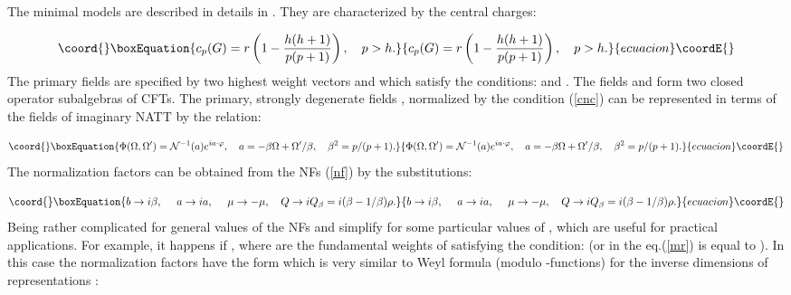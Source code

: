 \documentclass[a4paper,12pt]{article}
\begin{document}
The minimal models \coordHE{} are described in details in \cite{FL}. 
They are characterized by the central charges:

\begin{equation}\coord{}\boxEquation{
c_p(G)=r\left( 1-\frac{h(h+1)}{p(p+1)}\right) ,\quad p>h.  \label{cch}
}{
c_p(G)=r\left( 1-\frac{h(h+1)}{p(p+1)}\right) ,\quad p>h.  }{ecuacion}\coordE{}\end{equation}
The primary fields \coordHE{} are
specified by two highest weight vectors \myHighlight{$\Omega $}\coordHE{} and \myHighlight{$\Omega ^{\prime }$}\coordHE{}
which satisfy the conditions: \coordHE{} and  
\coordHE{}. 
The fields \coordHE{} and \coordHE{} form two closed operator
subalgebras of \coordHE{} CFTs. The primary, strongly degenerate 
fields \myHighlight{$\Phi (\Omega,\Omega ^{\prime })$}\coordHE{}, normalized by the condition 
(\ref{cnc}) can be
represented in terms of the fields \myHighlight{$\varphi $}\coordHE{} of imaginary NATT by the
relation:

\begin{equation}\coord{}\boxEquation{
\Phi (\Omega ,\Omega ^{\prime })={\cal N}^{-1}(a)e^{ia\cdot \varphi },\quad
a=-\beta \Omega +\Omega ^{\prime }/\beta ,\quad \beta ^2=p/(p+1).
\label{repr}
}{
\Phi (\Omega ,\Omega ^{\prime })={\cal N}^{-1}(a)e^{ia\cdot \varphi },\quad
a=-\beta \Omega +\Omega ^{\prime }/\beta ,\quad \beta ^2=p/(p+1).
}{ecuacion}\coordE{}\end{equation}
The normalization factors \coordHE{} can be obtained from the NFs \coordHE{}  
(\ref{nf}) by the substitutions:

\begin{equation}\coord{}\boxEquation{
b\rightarrow i\beta ,\quad \ a\rightarrow ia,\quad \ \mu \rightarrow -\mu
,\quad Q\rightarrow iQ_\beta =i(\beta -1/\beta )\rho .  \label{sbs}
}{
b\rightarrow i\beta ,\quad \ a\rightarrow ia,\quad \ \mu \rightarrow -\mu
,\quad Q\rightarrow iQ_\beta =i(\beta -1/\beta )\rho .  }{ecuacion}\coordE{}\end{equation}
Being rather complicated for general values of \coordHE{} the NFs \coordHE{}
and \coordHE{} simplify for some particular values of \coordHE{}, which are useful for
practical applications. For example, it happens if \coordHE{},
where \coordHE{} are the fundamental weights of \coordHE{} satisfying the condition: \coordHE{} (or \coordHE{} in the eq.(\ref{mr}) is equal to \coordHE{}). In this case the 
normalization factors have the
form which is very similar to Weyl formula (modulo \myHighlight{$\gamma $}\coordHE{}-functions) for
the inverse dimensions of representations \coordHE{}:
\end{document}

